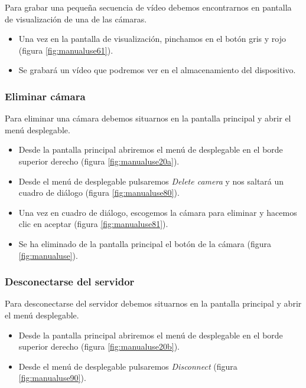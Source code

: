 Para grabar una pequeña secuencia de vídeo debemos encontrarnos en pantalla de visualización de una de las cámaras.

\begin{itemize}
\item
	Una vez en la pantalla de visualización, pinchamos en el botón gris y rojo (figura \ref{fig:manualuse61}).
\item
	Se grabará un vídeo que podremos ver en el almacenamiento del dispositivo.
\end{itemize}

\subsubsection{Eliminar cámara}

Para eliminar una cámara debemos situarnos en la pantalla principal y abrir el menú desplegable.

\begin{itemize}
\item
	Desde la pantalla principal abriremos el menú de desplegable en el borde superior derecho (figura \ref{fig:manualuse20a}).
\item
	Desde el menú de desplegable pulsaremos \textit{Delete camera} y nos saltará un cuadro de diálogo (figura \ref{fig:manualuse80}).
\item
	Una vez en cuadro de diálogo, escogemos la cámara para eliminar y hacemos clic en aceptar (figura \ref{fig:manualuse81}).
\item
	Se ha eliminado de la pantalla principal el botón de la cámara (figura \ref{fig:manualuse}).
\end{itemize}

\subsubsection{Desconectarse del servidor}

Para desconectarse del servidor debemos situarnos en la pantalla principal y abrir el menú desplegable.

\begin{itemize}
\item
	Desde la pantalla principal abriremos el menú de desplegable en el borde superior derecho (figura \ref{fig:manualuse20b}).
\item
	Desde el menú de desplegable pulsaremos \textit{Disconnect} (figura \ref{fig:manualuse90}).
\end{itemize}


